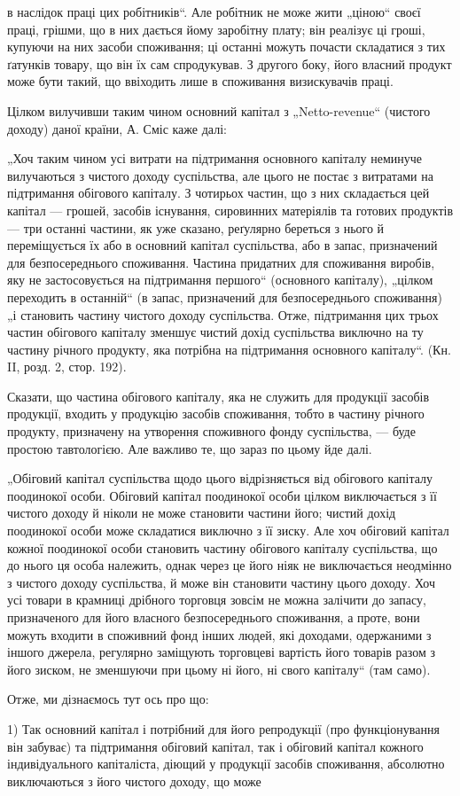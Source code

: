 \parcont{}  %
в наслідок праці цих робітників“. Але робітник не може жити „ціною“
своєї праці, грішми, що в них дається йому заробітну плату; він реалізує
ці гроші, купуючи на них засоби споживання; ці останні можуть
почасти складатися з тих ґатунків товару, що він їх сам спродукував.
З другого боку, його власний продукт може бути такий, що ввіходить
лише в споживання визискувачів праці.

Цілком вилучивши таким чином основний капітал з „Netto-revenue“
(чистого доходу) даної країни, А. Сміс каже далі:

„Хоч таким чином усі витрати на підтримання основного капіталу
неминуче вилучаються з чистого доходу суспільства, але цього не постає
з витратами на підтримання обігового капіталу. З чотирьох частин, що
з них складається цей капітал — грошей, засобів існування, сировинних
матеріялів та готових продуктів — три останні частини, як уже сказано,
реґулярно береться з нього й переміщується їх або в основний капітал
суспільства, або в запас, призначений для безпосереднього споживання.
Частина придатних для споживання виробів, яку не застосовується на
підтримання першого“ (основного капіталу), „цілком переходить в останній“
(в запас, призначений для безпосереднього споживання) „і становить
частину чистого доходу суспільства. Отже, підтримання цих трьох
частин обігового капіталу зменшує чистий дохід суспільства виключно
на ту частину річного продукту, яка потрібна на підтримання основного
капіталу“. (Кн. II, розд. 2, стор. 192).

Сказати, що частина обігового капіталу, яка не служить для продукції
засобів продукції, входить у продукцію засобів споживання, тобто в частину
річного продукту, призначену на утворення споживного фонду
суспільства, — буде простою тавтологією. Але важливо те, що зараз по
цьому йде далі.

„Обіговий капітал суспільства щодо цього відрізняється від обігового
капіталу поодинокої особи. Обіговий капітал поодинокої особи цілком
виключається з її чистого доходу й ніколи не може становити частини
його; чистий дохід поодинокої особи може складатися виключно з її
зиску. Але хоч обіговий капітал кожної поодинокої особи становить
частину обігового капіталу суспільства, що до нього ця особа належить,
однак через це його ніяк не виключається неодмінно з чистого доходу
суспільства, й може він становити частину цього доходу. Хоч усі товари
в крамниці дрібного торговця зовсім не можна залічити до запасу, призначеного
для його власного безпосереднього споживання, а проте, вони
можуть входити в споживний фонд інших людей, які доходами, одержаними
з іншого джерела, регулярно заміщують торговцеві вартість його
товарів разом з його зиском, не зменшуючи при цьому ні його, ні свого
капіталу“ (там само).

Отже, ми дізнаємось тут ось про що:

1) Так основний капітал і потрібний для його репродукції (про функціонування
він забуває) та підтримання обіговий капітал, так і обіговий
капітал кожного індивідуального капіталіста, діющий у продукції засобів
споживання, абсолютно виключаються з його чистого доходу, що може
\parbreak{}  %

